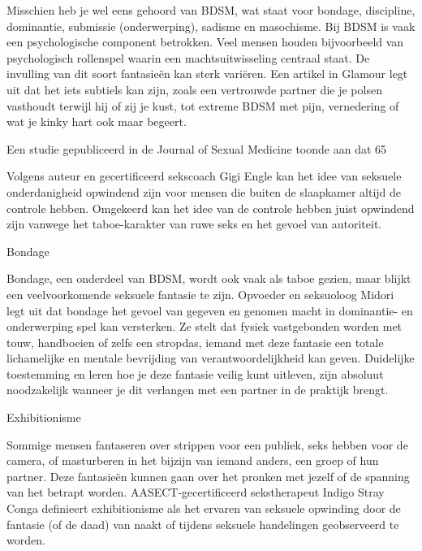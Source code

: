 Misschien heb je wel eens gehoord van BDSM, wat staat voor bondage, discipline, dominantie, submissie (onderwerping), sadisme en masochisme. Bij BDSM is vaak een psychologische component betrokken. Veel mensen houden bijvoorbeeld van psychologisch rollenspel waarin een machtsuitwisseling centraal staat. De invulling van dit soort fantasieën kan sterk variëren. Een artikel in Glamour legt uit dat het iets subtiels kan zijn, zoals een vertrouwde partner die je polsen vasthoudt terwijl hij of zij je kust, tot extreme BDSM met pijn, vernedering of wat je kinky hart ook maar begeert.

Een studie gepubliceerd in de Journal of Sexual Medicine toonde aan dat 65 %

Volgens auteur en gecertificeerd sekscoach Gigi Engle kan het idee van seksuele onderdanigheid opwindend zijn voor mensen die buiten de slaapkamer altijd de controle hebben. Omgekeerd kan het idee van de controle hebben juist opwindend zijn vanwege het taboe-karakter van ruwe seks en het gevoel van autoriteit.

Bondage

Bondage, een onderdeel van BDSM, wordt ook vaak als taboe gezien, maar blijkt een veelvoorkomende seksuele fantasie te zijn. Opvoeder en seksuoloog Midori legt uit dat bondage het gevoel van gegeven en genomen macht in dominantie- en onderwerping spel kan versterken. Ze stelt dat fysiek vastgebonden worden met touw, handboeien of zelfs een stropdas, iemand met deze fantasie een totale lichamelijke en mentale bevrijding van verantwoordelijkheid kan geven. Duidelijke toestemming en leren hoe je deze fantasie veilig kunt uitleven, zijn absoluut noodzakelijk wanneer je dit verlangen met een partner in de praktijk brengt.

Exhibitionisme

Sommige mensen fantaseren over strippen voor een publiek, seks hebben voor de camera, of masturberen in het bijzijn van iemand anders, een groep of hun partner. Deze fantasieën kunnen gaan over het pronken met jezelf of de spanning van het betrapt worden. AASECT-gecertificeerd sekstherapeut Indigo Stray Conga definieert exhibitionisme als het ervaren van seksuele opwinding door de fantasie (of de daad) van naakt of tijdens seksuele handelingen geobserveerd te worden.


